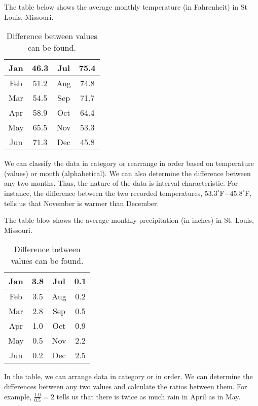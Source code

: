 \begin{example} [Interval] 
The table below shows the average monthly temperature (in Fahrenheit) in St Louis, Missouri.
\begin{table}[h]
\centering
\caption{Difference between values can be found.}
\begin{tabular}{|c|c|c|c|}
\hline
Jan & 46.3 & Jul & 75.4 \\
\hline
Feb & 51.2 & Aug & 74.8 \\
\hline
Mar & 54.5 & Sep & 71.7  \\
\hline
Apr & 58.9 & Oct & 64.4 \\
\hline
May & 65.5 & Nov & 53.3 \\
\hline
Jun & 71.3 & Dec & 45.8 \\
\hline 
\end{tabular}
\label{tab:interrval}
\end{table} 
We can classify the data in category or rearrange in order based on temperature (values) or month (alphabetical). We can also determine the difference between any two months. Thus, the nature of the data is interval characteristic. For instance, the difference between the two recorded temperatures, $53.3^{\circ}$F$ - 45.8^{\circ}$F, tells us that November is warmer than December. 
\end{example} 

\begin{example} [Ratio] 
The table blow shows the average monthly precipitation (in inches) in St. Louis, Missouri.
\begin{table}[h]
\centering
\caption{Difference between values can be found.}
\begin{tabular}{|c|c|c|c|}
\hline
Jan & 3.8 & Jul & 0.1 \\
\hline
Feb & 3.5 & Aug & 0.2 \\
\hline
Mar & 2.8 & Sep & 0.5  \\
\hline
Apr & 1.0 & Oct & 0.9 \\
\hline
May & 0.5 & Nov & 2.2 \\
\hline
Jun & 0.2 & Dec & 2.5 \\
\hline 
\end{tabular}
\label{tab:ratio} 
\end{table} 
In the table, we can arrange data in category or in order. We can determine the differences between any two values and calculate the ratios between them. For example, $\frac{1.0}{0.5} = 2$ tells us that there is twice as much rain in April as in May.
\end{example} 
 
